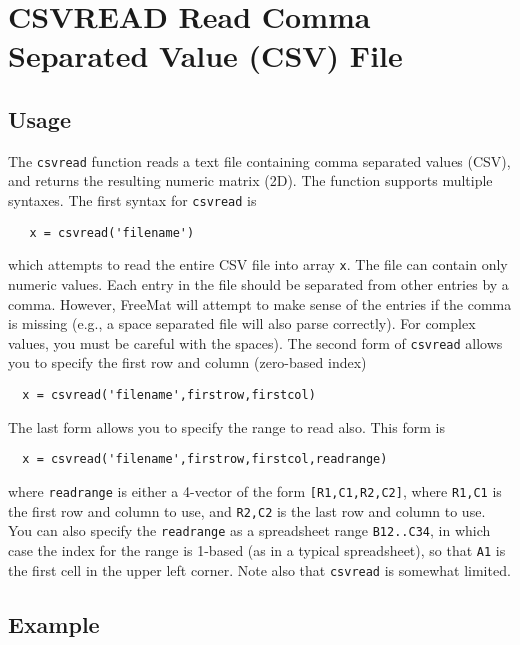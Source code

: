 \section{CSVREAD Read Comma Separated Value (CSV) File}

\subsection{Usage}

The \verb|csvread| function reads a text file containing comma
separated values (CSV), and returns the resulting numeric
matrix (2D).  The function supports multiple syntaxes.  The
first syntax for \verb|csvread| is 
\begin{verbatim}
   x = csvread('filename')
\end{verbatim}
which attempts to read the entire CSV file into array \verb|x|.
The file can contain only numeric values.  Each entry in the
file should be separated from other entries by a comma.  However,
FreeMat will attempt to make sense of the entries if the comma
is missing (e.g., a space separated file will also parse correctly).
For complex values, you must be careful with the spaces).  The second
form of \verb|csvread| allows you to specify the first row and column 
(zero-based index)
\begin{verbatim}
  x = csvread('filename',firstrow,firstcol)
\end{verbatim}
The last form allows you to specify the range to read also.  This form
is
\begin{verbatim}
  x = csvread('filename',firstrow,firstcol,readrange)
\end{verbatim}
where \verb|readrange| is either a 4-vector of the form \verb|[R1,C1,R2,C2]|,
where \verb|R1,C1| is the first row and column to use, and \verb|R2,C2| is the
last row and column to use.  You can also specify the \verb|readrange| as
a spreadsheet range \verb|B12..C34|, in which case the index for the
range is 1-based (as in a typical spreadsheet), so that \verb|A1| is the
first cell in the upper left corner. Note also that \verb|csvread| is
somewhat limited. 
\subsection{Example}

